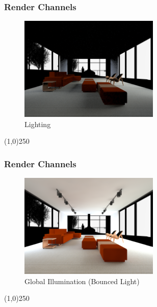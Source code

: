 \begin{frame}
\frametitle{Render Channels}
\begin{figure}
	\centering
	\includegraphics[height=5cm]{./img/Rendering/SittingRoomFinalLighting}
	\caption[Lighting]{Lighting}
	\label{fig:sittingroomfinalLighting}
\end{figure}
\end{frame}
\begin{center}\line(1,0){250}\end{center}






\begin{frame}
\frametitle{Render Channels}
\begin{figure}
	\centering
	\includegraphics[height=5cm]{./img/Rendering/SittingRoomFinalGlobal_Illumination.png}
	\caption[Global Illumination (Bounced Light)]{Global Illumination (Bounced Light)}
	\label{fig:sittingroomfinalGlobalIllumination}
\end{figure}
\end{frame}
\begin{center}\line(1,0){250}\end{center}







